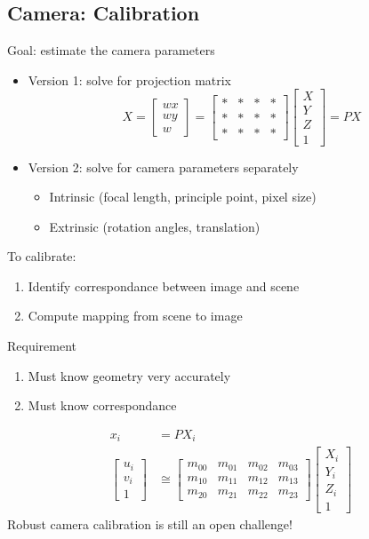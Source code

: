 \documentclass[10pt]{article}
\begin{document}
\subsection*{Camera: Calibration}
Goal: estimate the camera parameters
\begin{itemize}
	\item Version 1: solve for projection matrix
	\[X = \begin{bmatrix} wx \\ wy \\ w \end{bmatrix} = \begin{bmatrix} * & * & * & * \\ * & * & * & * \\ * & * & * & * \end{bmatrix} \begin{bmatrix} X \\ Y \\ Z \\ 1 \end{bmatrix} = PX\]
    \item Version 2: solve for camera parameters separately
    \begin{itemize}
        \item Intrinsic (focal length, principle point, pixel size)
        \item Extrinsic (rotation angles, translation)
    \end{itemize}
\end{itemize}
To calibrate:
\begin{enumerate}
    \item Identify correspondance between image and scene
    \item Compute mapping from scene to image
\end{enumerate}
Requirement
\begin{enumerate}
    \item Must know geometry very accurately
    \item Must know correspondance
\end{enumerate}
\begin{align*}
    x_i &= PX_i \\
    \begin{bmatrix} u_i \\ v_i \\ 1 \end{bmatrix} &\cong \begin{bmatrix} m_{00} & m_{01} & m_{02} & m_{03} \\ m_{10} & m_{11} & m_{12} & m_{13} \\ m_{20} & m_{21} & m_{22} & m_{23} \end{bmatrix} \begin{bmatrix} X_i \\ Y_i \\ Z_i \\ 1 \end{bmatrix}
\end{align*}
Robust camera calibration is still an open challenge!
\end{document}
